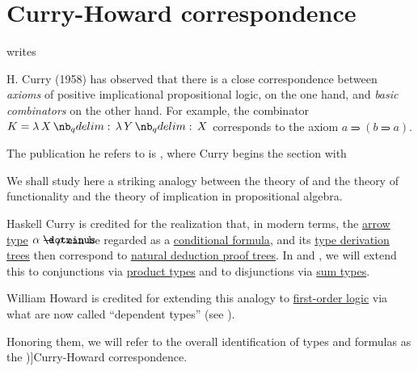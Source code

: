 \section{Curry-Howard correspondence}\label{sec:curry_howard_correspondence}

\begin{concept}\label{con:curry_howard_correspondence}
   writes
  \begin{displayquote}
    H. Curry (1958) has observed that there is a close correspondence between \textit{axioms} of positive implicational propositional logic, on the one hand, and \textit{basic combinators} on the other hand. For example, the combinator \( K = \qabs X \qabs Y X \) corresponds to the axiom \( a \rightimply (b \rightimply a) \).
  \end{displayquote}

  The publication he refers to is \cite[312]{CurryFeysCraig1958CombinatoryLogicVol1}, where Curry begins the section with
  \begin{displayquote}
    We shall study here a striking analogy between the theory of and the theory of functionality and the theory of implication in propositional algebra.
  \end{displayquote}

  Haskell Curry is credited for the realization that, in modern terms, the \hyperref[def:simple_type]{arrow type} \( \alpha \synimplies \rho \) can be regarded as a \hyperref[def:propositional_alphabet/connectives/conditional]{conditional formula}, and its \hyperref[def:type_derivation_tree]{type derivation trees} then correspond to \hyperref[def:natural_deduction_proof_tree]{natural deduction proof trees}. In  and , we will extend this to conjunctions via \hyperref[def:product_type]{product types} and to disjunctions via \hyperref[def:sum_type]{sum types}.

  William Howard is credited for extending this analogy to \hyperref[sec:first_order_logic]{first-order logic} via what are now called \enquote{dependent types} (see ).

  Honoring them, we will refer to the overall identification of types and formulas as the \term[en=Curry-Howard correspondence (\cite[def. 4.1.7]{Mimram2020ProgramEqualsProof})]{Curry-Howard correspondence}.
\end{concept}
